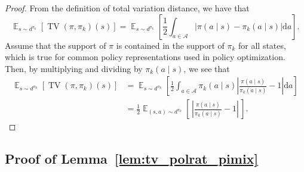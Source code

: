 \documentclass{article}
\begin{document}
\begin{proof}
From the definition of total variation distance, we have that
\begin{equation}
\mathop{\mathbb{E}}_{s \sim d^{\pi_k}} \left[ \operatorname{TV}(\pi,\pi_k)(s) \right] = \mathop{\mathbb{E}}_{s \sim d^{\pi_k}} \left[ \frac{1}{2} \int_{a \in \mathcal{A}} \left| \pi(a \mid s) - \pi_k(a \mid s)  \right| \mathrm{d}a \right].
\end{equation}
Assume that the support of $\pi$ is contained in the support of $\pi_k$ for all states, which is true for common policy representations used in policy optimization. Then, by multiplying and dividing by $\pi_k(a \mid s)$, we see that
\begin{equation}
\begin{split}
\mathop{\mathbb{E}}_{s \sim d^{\pi_k}} \left[ \operatorname{TV}(\pi,\pi_k)(s) \right] &=  \mathop{\mathbb{E}}_{s \sim d^{\pi_k}} \left[ \frac{1}{2} \int_{a \in \mathcal{A}} \pi_k(a \mid s) \left| \frac{\pi(a \mid s)}{\pi_k(a \mid s)} - 1  \right| \mathrm{d}a \right] \\
&= \frac{1}{2} \mathop{\mathbb{E}}_{(s,a) \sim d^{\pi_k}} \left[ \, \left| \frac{\pi(a \mid s)}{\pi_k(a \mid s)} - 1  \right| \, \right].
\end{split}
\end{equation}

\end{proof}

\subsection{Proof of Lemma~\ref{lem:tv_polrat_pimix}}
\end{document}
